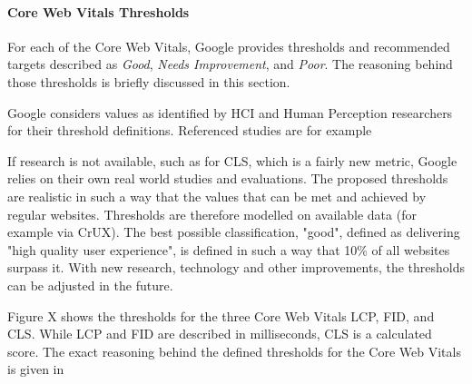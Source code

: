 



\paragraph{Core Web Vitals Thresholds}

For each of the Core Web Vitals, Google provides thresholds and recommended targets described as \textit{Good}, \textit{Needs Improvement}, and \textit{Poor}.
The reasoning behind those thresholds is briefly discussed in this section.

Google considers values as identified by HCI and Human Perception researchers for their threshold definitions.
Referenced studies are for example

If research is not available, such as for CLS, which is a fairly new metric, Google relies on their own real world studies and evaluations.
The proposed thresholds are realistic in such a way that the values that can be met and achieved by regular websites.
Thresholds are therefore modelled on available data (for example via CrUX).
The best possible classification, "good", defined as delivering "high quality user experience", is defined in such a way that 10\% of all websites surpass it.
With new research, technology and other improvements, the thresholds can be adjusted in the future.


Figure X shows the thresholds for the three Core Web Vitals LCP, FID, and CLS.
While LCP and FID are described in milliseconds, CLS is a calculated score.
The exact reasoning behind the defined thresholds for the Core Web Vitals is given in %


